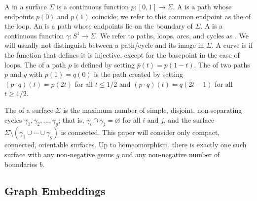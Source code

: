 \documentclass{sig-alternate}
\def\arc#1#2{#1\mathord\shortrightarrow#2}
\def\head{\operatorname{head}}
\def\tail{\operatorname{tail}}
\def\rev{\operatorname{rev}}
\def\head{\emph{head}}
\def\tail{\emph{tail}}
\def\rev{\emph{rev}}
\begin{document}
A  in a surface $\Sigma$ is a continuous function $p\colon [0,1]\to\Sigma$.  A  is a path whose endpoints $p(0)$ and $p(1)$ coincide; we refer to this common endpoint as the  of the loop.  An  is a path whose endpoints  lie on the boundary of $\Sigma$.  A  is a continuous function $\gamma\colon S^1\to\Sigma$.  We refer to paths, loops, arcs, and cycles as .  We will usually not distinguish between a path/cycle and its image in $\Sigma$.  A curve is  if the function that defines it is injective, except for the basepoint in the case of loops.  The  of a path $p$ is defined by setting $\overline{p}(t) = p(1-t)$.  The  of two paths $p$ and $q$ with $p(1) = q(0)$ is the path created by setting $(p\cdot q)(t) = p(2t)$ for all $t \le 1/2$ and $(p\cdot q)(t) = q(2t-1)$ for all $t \ge 1/2$.

The  of a surface $\Sigma$ is the maximum number of simple, disjoint, non-separating cycles $\gamma_1, \gamma_2, \dots, \gamma_g$; that is, $\gamma_i\cap\gamma_j = \varnothing$ for all $i$ and $j$, and the surface $\Sigma\setminus(\gamma_1\cup\cdots\cup\gamma_g)$ is connected.  This paper will consider only compact, connected, orientable surfaces.  Up to homeomorphism, there is exactly one such surface with any non-negative genus $g$ and any non-negative number of boundaries $b$.


\subsection{Graph Embeddings}

\end{document}
